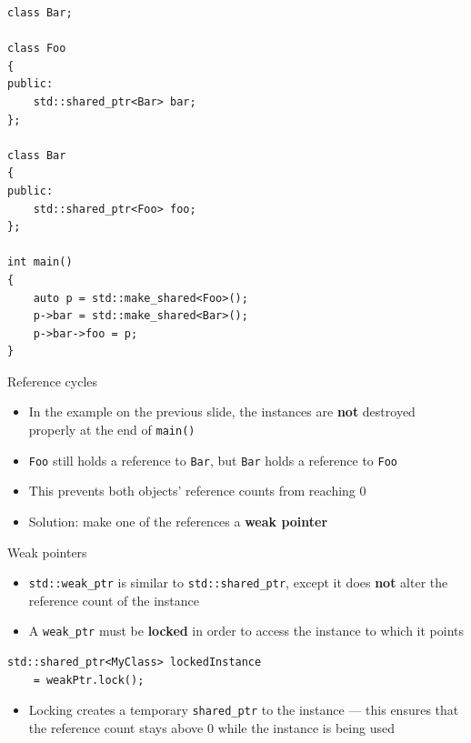 \begin{frame}[fragile]
    \begin{lstlisting}
class Bar;

class Foo
{
public:
    std::shared_ptr<Bar> bar;
};

class Bar
{
public:
    std::shared_ptr<Foo> foo;
};

int main()
{
    auto p = std::make_shared<Foo>();
    p->bar = std::make_shared<Bar>();
    p->bar->foo = p;
}
    \end{lstlisting}
\end{frame}

\begin{frame}{Reference cycles}
    \begin{itemize}
        \item In the example on the previous slide,
            the instances are \textbf{not} destroyed properly at the end of \lstinline{main()}
        \item \lstinline{Foo} still holds a reference to \lstinline{Bar},
            but \lstinline{Bar} holds a reference to \lstinline{Foo}
        \item This prevents both objects' reference counts from reaching 0
        \item Solution: make one of the references a \textbf{weak pointer}
    \end{itemize}
\end{frame}

\begin{frame}[fragile]{Weak pointers}
    \begin{itemize}
        \item \lstinline{std::weak_ptr} is similar to \lstinline{std::shared_ptr},
            except it does \textbf{not} alter the reference count of the instance
        \item A \lstinline{weak_ptr} must be \textbf{locked} in order to access the instance to which
            it points
    \end{itemize}
    \begin{lstlisting}
std::shared_ptr<MyClass> lockedInstance
    = weakPtr.lock();
    \end{lstlisting}
    \begin{itemize}
        \item Locking creates a temporary \lstinline{shared_ptr} to the instance ---
            this ensures that the reference count stays above 0 while the instance is being used
    \end{itemize}
\end{frame}

